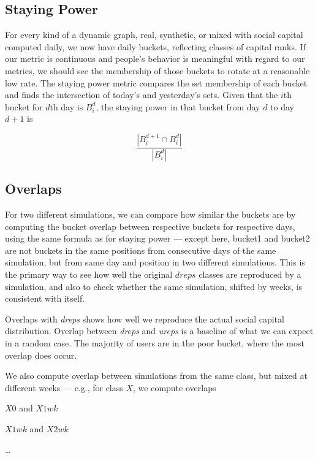 \documentclass[10pt,oneside]{memoir}
\begin{document}
\subsection{Staying Power}
\label{stayingpower}

\label{sec:staying-power}
For every kind of a dynamic graph, real, synthetic, or mixed with social capital computed daily, we now have daily buckets, reflecting classes of capital ranks.  If our metric is continuous and people's behavior is meaningful with regard to our metrics, we should see the membership of those buckets to rotate at a reasonable low rate.  The staying power metric compares the set membership of each bucket and finds the intersection of today's and yesterday's sets.  Given that the $i$th bucket for $d$th day is $B_i^d$, the staying power in that bucket from day $d$ to day $d+1$ is

\[ \frac{|B_i^{d+1} \cap B_i^d|}{|B_i^d|} \]



\subsection{Overlaps}
\label{overlaps}

For two different simulations, we can compare how similar the buckets are by computing the bucket overlap between respective buckets for respective days, using the same formula as for staying power --- except here, bucket1 and bucket2 are not buckets in the same positions from consecutive days of the same simulation,  but from same day and position in two different simulations.  This is the primary way to see how well the original $dreps$ classes are reproduced by a simulation, and also to check whether the same simulation, shifted by weeks, is consistent with itself.


\label{sec:overx-dreps}
Overlaps with {\itshape dreps} shows how well we reproduce the actual social capital distribution.  Overlap between {\itshape dreps} and {\itshape ureps} is a baseline of what we can expect in a random case.  The majority of users are in the poor bucket, where the most overlap does occur.


\label{sec:overx-self}
We also compute overlap between simulations from the same class, but mixed at different weeks --- e.g., for class $X$, we compute overlaps


$X0$ and $X1wk$


$X1wk$ and $X2wk$


{\ldots}
\end{document}
